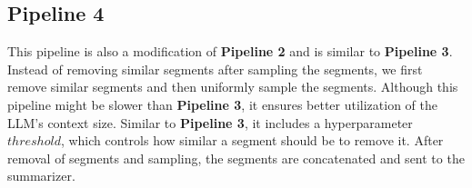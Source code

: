 \subsection*{Pipeline 4}

This pipeline is also a modification of \textbf{Pipeline 2} and is similar to
\textbf{Pipeline 3}.
Instead of removing similar segments after sampling the segments, we first remove similar
segments and then uniformly sample the segments.
Although this pipeline might be slower than \textbf{Pipeline 3}, it ensures better
utilization of the LLM's context size.
Similar to \textbf{Pipeline 3}, it includes a hyperparameter $threshold$, which controls
how similar a segment should be to remove it.
After removal of segments and sampling, the segments are concatenated and sent to the
summarizer.
